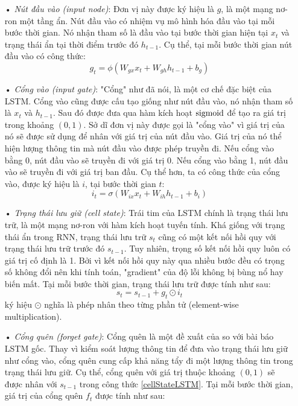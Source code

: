 \begin{itemize}
	\item[•] \textit{Nút đầu vào (input node)}: Đơn vị này được ký hiệu là $g$, là một mạng nơ-ron một tầng ẩn. Nút đầu vào có nhiệm vụ mô hình hóa đầu vào tại mỗi bước thời gian. Nó nhận tham số là đầu vào tại bước thời gian hiện tại $x_t$ và trạng thái ẩn tại thời điểm trước đó $h_{t-1}$. Cụ thể, tại mỗi bước thời gian nút đầu vào có công thức:
	\begin{equation} \label{inputNodeLSTM}
	g_t = \phi \left(W_{gx}x_t + W_{gh}h_{t-1} + b_g \right)
	\end{equation}
	\item[•] \textit{Cổng vào (input gate)}: "Cổng" như đã nói, là một cơ chế đặc biệt của LSTM. Cổng vào cũng được cấu tạo giống như nút đầu vào, nó nhận tham số là $x_t$ và $h_{t-1}$. Sau đó được đưa qua hàm kích hoạt $\mathrm{sigmoid}$ để tạo ra giá trị trong khoảng $(0,1)$. Sở dĩ đơn vị này được gọi là "cổng vào" vì giá trị của nó sẽ được sử dụng để nhân với giá trị của nút đầu vào. Giá trị của nó thể hiện lượng thông tin mà nút đầu vào được phép truyền đi. Nếu cổng vào bằng 0, nút đầu vào sẽ truyền đi với giá trị 0. Nếu cổng vào bằng 1, nút đầu vào sẽ truyền đi với giá trị ban đầu. Cụ thể hơn, ta có công thức của cổng vào, được ký hiệu là $i$, tại bước thời gian $t$:
	\begin{equation} \label{inputGateLSTM}
	i_t = \sigma \left(W_{ix}x_t + W_{ih}h_{t-1} + b_i \right)
	\end{equation}
	\item[•] \textit{Trạng thái lưu giữ (cell state)}: Trái tim của LSTM chính là trạng thái lưu trữ, là một mạng nơ-ron với hàm kích hoạt tuyến tính. Khá giống với trạng thái ẩn trong RNN, trạng thái lưu trữ $s_t$ cũng có một kết nối hồi quy với trạng thái lưu trữ trước đó $s_{t-1}$. Tuy nhiên, trọng số kết nối hồi quy luôn có giá trị cố định là 1. Bởi vì kết nối hồi quy này qua nhiều bước đều có trọng số không đổi nên khi tính toán, "gradient" của độ lỗi không bị bùng nổ hay biến mất. Tại mỗi bước thời gian, trạng thái lưu trữ được tính như sau:
	\begin{equation} \label{cellStateLSTM}
	s_t = s_{t-1} + g_t \odot i_t
	\end{equation}
	ký hiệu $\odot$ nghĩa là phép nhân theo từng phần tử (element-wise multiplication).
	\item[•] \textit{Cổng quên (forget gate)}: Cổng quên là một đề xuất của \cite{gers2000} so với bài báo LSTM gốc. Thay vì kiểm soát lượng thông tin để đưa vào trạng thái lưu giữ như cổng vào, cổng quên cung cấp khả năng tẩy đi một lượng thông tin trong trạng thái lưu giữ. Cụ thể, cổng quên với giá trị thuộc khoảng $(0,1)$ sẽ được nhân với $s_{t-1}$ trong công thức \ref{cellStateLSTM}. Tại mỗi bước thời gian, giá trị của cổng quên $f_t$ được tính như sau:

\end{itemize}
